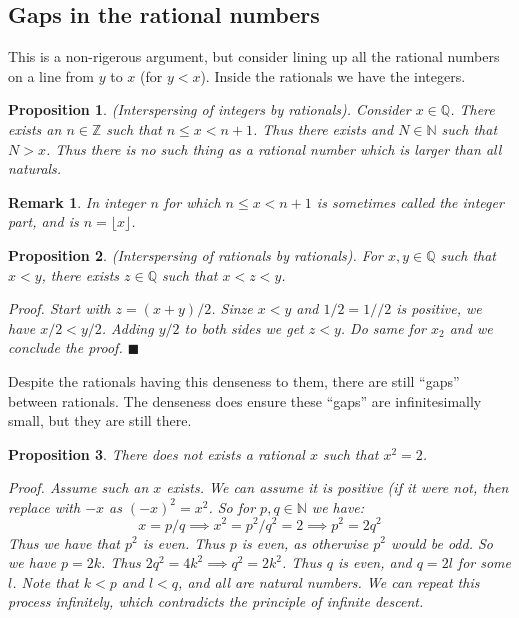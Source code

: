 \documentclass{article}
\newtheorem{remark}{Remark}[subsection]
\newtheorem{proposition}{Proposition}[subsection]
\newcommand{\Q}{\mathbb{Q}}
\newcommand{\Z}{\mathbb{Z}}
\newcommand{\N}{\mathbb{N}}
\let\it\textit
\begin{document}
\subsection{Gaps in the rational numbers}

This is a non-rigerous argument, but consider lining up all 
the rational numbers on a line from $y$ to $x$ (for $y < x$). 
Inside the rationals we have the integers. 

\begin{proposition}
	(Interspersing of integers by rationals). Consider $x\in\Q$. 
	There exists an $n\in\Z$ such that $n \leq x < n+1$. Thus 
	there exists and $N \in \N$ such that $N > x$. Thus there 
	is no such thing as a rational number which is larger 
	than all naturals.
\end{proposition}

\begin{remark}
	In integer $n$  for which $n \leq x < n+1$ is sometimes 
	called the integer part, and is $n = \lfloor x \rfloor$.
\end{remark}

\begin{proposition}
	(Interspersing of rationals by rationals). For $x,y \in \Q$ 
	such that $x < y$, there exists $z \in \Q$ such that
	$x < z < y$.

	\it{Proof}. Start with $z = (x+y)/2$. Sinze $x < y$ 
	and $1/2 = 1//2$ is positive, we have $x/2 < y/2$. Adding 
	$y/2$ to both sides we get $z < y$. Do same for $x_2$ and 
	we conclude the proof. \hfill $\blacksquare$
\end{proposition}

Despite the rationals having this denseness to them, there are 
still ``gaps'' between rationals. The denseness does ensure these
``gaps'' are infinitesimally small, but they are still there.

\begin{proposition}
	There does not exists a rational $x$ such that $x^2 = 2$.

	\it{Proof}. Assume such an $x$ exists. We can assume 
	it is positive (if it were not, then replace with $-x$ 
	as $(-x)^2 = x^2$. So for $p,q \in \N$ we have: 
	$$
	x = p/q \implies x^2  = p^2/q^2 = 2 \implies p^2 = 2q^2
	$$
	Thus we have that $p^2$ is even. Thus $p$ is even, as 
	otherwise $p^2$ would be odd. So we have $p = 2k$. Thus 
	$2q^2 = 4k^2 \implies q^2 = 2k^2$. Thus $q$ is even, 
	and $q = 2l$ for some $l$. Note that $k < p$ and $ l < q$, 
	and all are natural numbers. We can repeat this 
	process infinitely, which contradicts the 
	principle of infinite descent.
\end{proposition}
\end{document}
